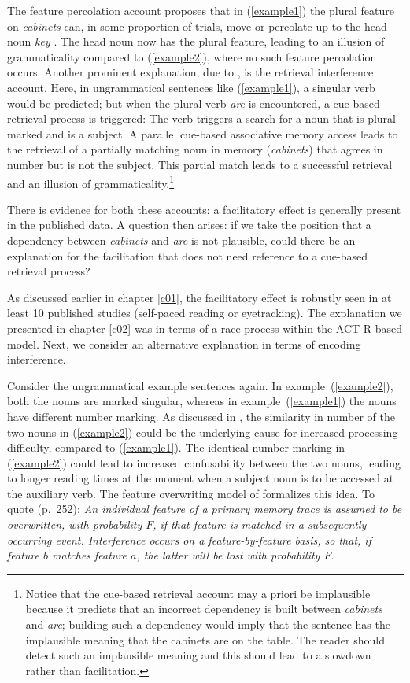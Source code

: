 \documentclass{cambridge7A}\usepackage[]{graphicx}\usepackage[]{color}
\begin{document}
The feature percolation account proposes that in (\ref{example1}) the plural feature on \textit{cabinets} can, in some proportion of trials, move or percolate up to the head noun \textit{key}  \citep[see][for recent evidence for this model]{patson2016misinterpretations}. The head noun now has the plural feature, leading to an illusion of grammaticality compared to (\ref{example2}), where no such feature percolation occurs. 
Another prominent explanation, due to \cite{WagersLauPhillips2009}, is the retrieval interference account. Here, in ungrammatical sentences like (\ref{example1}), a singular verb would be predicted; but when the plural verb \textit{are} is encountered, a cue-based retrieval process is triggered: The verb triggers a search for a noun that is plural marked and is a subject. A parallel cue-based associative memory access leads to the retrieval of a partially matching noun in memory (\textit{cabinets}) that agrees in number but is not the subject. This partial match leads to a successful retrieval and an illusion of grammaticality.\footnote{Notice that the cue-based retrieval account may a priori be implausible because it predicts that an incorrect dependency is built between \textit{cabinets} and \textit{are}; building such a dependency would imply that the sentence has the implausible meaning that the cabinets are on the table. The reader should detect such an implausible meaning and this should lead to a slowdown rather than facilitation.} 

There is evidence for both these accounts: a facilitatory effect is generally present in the published data. 
A question then arises: if we take the position that a dependency between \textit{cabinets} and \textit{are} is not plausible, could there be an explanation for the facilitation that does not need reference to a cue-based retrieval process?

As discussed earlier in chapter \ref{c01}, the facilitatory effect is robustly seen in at least 10 published studies (self-paced reading or eyetracking). The explanation we presented in chapter \ref{c02} was in terms of a race process within the ACT-R based model. Next, we consider an alternative explanation in terms of encoding interference.

Consider the ungrammatical example sentences again. In example~(\ref{example2}),
both the nouns are marked singular, whereas in example~(\ref{example1}) the nouns have different number marking. 
As discussed in \cite{VillataFranck},
the similarity in number of the two nouns in (\ref{example2}) could be the underlying cause for increased processing difficulty, compared to (\ref{example1}).
The identical number marking in (\ref{example2}) could lead to increased confusability between the two nouns, leading to longer reading times at the moment when a subject noun is to be accessed at the auxiliary verb. 
The feature overwriting model of \cite{Nairne1990} formalizes this idea. To quote (p.\ 252):
\textit{An individual feature of a primary memory trace is assumed to be overwritten, with probability $F$, if that feature is matched in a subsequently occurring event. Interference occurs on a feature-by-feature basis, so that, if feature $b$ matches feature $a$, the latter will be lost with probability $F$}.
\end{document}
